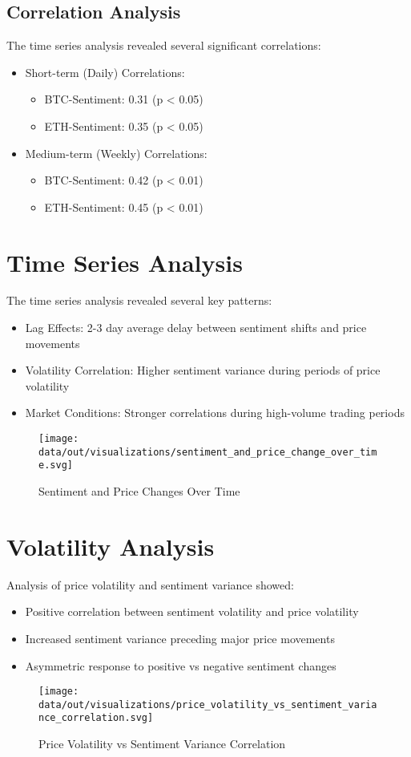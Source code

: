 \documentclass[12pt,a4paper]{report}
\begin{document}
\subsection{Correlation Analysis}
The time series analysis revealed several significant correlations:
\begin{itemize}
    \item Short-term (Daily) Correlations:
          \begin{itemize}
              \item BTC-Sentiment: 0.31 (p < 0.05)
              \item ETH-Sentiment: 0.35 (p < 0.05)
          \end{itemize}
    \item Medium-term (Weekly) Correlations:
          \begin{itemize}
              \item BTC-Sentiment: 0.42 (p < 0.01)
              \item ETH-Sentiment: 0.45 (p < 0.01)
          \end{itemize}
\end{itemize}
\section{Time Series Analysis}
The time series analysis revealed several key patterns:
\begin{itemize}
    \item Lag Effects: 2-3 day average delay between sentiment shifts and price movements
    \item Volatility Correlation: Higher sentiment variance during periods of price
          volatility
    \item Market Conditions: Stronger correlations during high-volume trading periods
\end{itemize}
\begin{figure}[H]
    \centering
    \texttt{[image: data/out/visualizations/sentiment\_and\_price\_change\_over\_time.svg]}
    \caption{Sentiment and Price Changes Over Time}
\end{figure}
\section{Volatility Analysis}
Analysis of price volatility and sentiment variance showed:
\begin{itemize}
    \item Positive correlation between sentiment volatility and price volatility
    \item Increased sentiment variance preceding major price movements
    \item Asymmetric response to positive vs negative sentiment changes
\end{itemize}
\begin{figure}[H]
    \centering
    \texttt{[image: data/out/visualizations/price\_volatility\_vs\_sentiment\_variance\_correlation.svg]}
    \caption{Price Volatility vs Sentiment Variance Correlation}
\end{figure}
\end{document}
